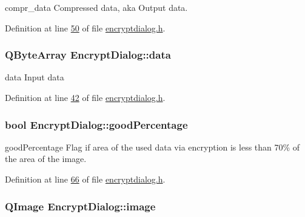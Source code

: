 compr\+\_\+data Compressed data, aka Output data. 



Definition at line \hyperlink{encryptdialog_8h_source_l00050}{50} of file \hyperlink{encryptdialog_8h_source}{encryptdialog.\+h}.

\subsubsection[{\texorpdfstring{data}{data}}]{\setlength{\rightskip}{0pt plus 5cm}Q\+Byte\+Array Encrypt\+Dialog\+::data}\hypertarget{class_encrypt_dialog_acf3a8bbce90d99ef17fec093c35b1008}{}\label{class_encrypt_dialog_acf3a8bbce90d99ef17fec093c35b1008}


data Input data 



Definition at line \hyperlink{encryptdialog_8h_source_l00042}{42} of file \hyperlink{encryptdialog_8h_source}{encryptdialog.\+h}.

\subsubsection[{\texorpdfstring{good\+Percentage}{goodPercentage}}]{\setlength{\rightskip}{0pt plus 5cm}bool Encrypt\+Dialog\+::good\+Percentage}\hypertarget{class_encrypt_dialog_a0c821b893cfddd7a6c07bbd270ba49e9}{}\label{class_encrypt_dialog_a0c821b893cfddd7a6c07bbd270ba49e9}


good\+Percentage Flag if area of the used data via encryption is less than 70\% of the area of the image. 



Definition at line \hyperlink{encryptdialog_8h_source_l00066}{66} of file \hyperlink{encryptdialog_8h_source}{encryptdialog.\+h}.

\subsubsection[{\texorpdfstring{image}{image}}]{\setlength{\rightskip}{0pt plus 5cm}Q\+Image Encrypt\+Dialog\+::image}\hypertarget{class_encrypt_dialog_a739a0df1d28d06b28a3fd16e2bc16c73}{}\label{class_encrypt_dialog_a739a0df1d28d06b28a3fd16e2bc16c73}


